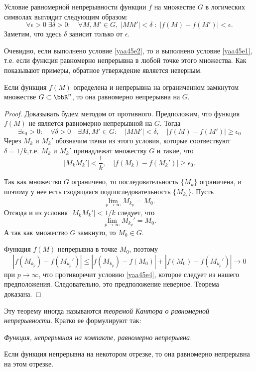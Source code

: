 Условие равномерной непрерывности функции $f$ на множестве $G$ в логических символах выглядит следующим образом:
\begin{equation}\label{yaa45e2}
\forall\epsilon>0\;\exists\delta>0:\quad\forall M, M'\in G,\; |MM'|<\delta\; :\; |f(M)-f(M')|<\epsilon.
\end{equation}
Заметим, что здесь $\delta$ зависит только от $\epsilon$.

Очевидно, если выполнено условие \eqref{yaa45e2}, то и выполнено условие \eqref{yaa45e1}, т.е. если функция равномерно непрерывна в любой точке этого множества. Как показывают примеры, обратное утверждение является неверным.

\begin{thm}
Если функция $f(M)$ определена и непрерывна на ограниченном замкнутом множестве $G\subset\bbR^n$, то она равномерно непрерывна на $G$.
\end{thm}

\begin{proof}
Доказывать будем методом от противного. Предположим, что функция $f(M)$ не является равномерно непрерывной на $G$. Тогда
$$
\exists\epsilon_0>0:\quad\forall\delta>0\quad\exists M,M'\in G:\quad |MM'|<\delta, \quad |f(M)-f(M')|\ge \epsilon_0
$$
Через $M_k$ и $M_k'$ обозначим точки из этого условия, которые соотвествуют $\delta=1/k$,т.е. $M_k$ и $M_k'$ принадлежат множеству $G$ и такие, что 
\begin{equation}\label{yaa45e4}
|M_kM_k'|<\frac{1}{k},\quad|f(M_k)-f(M_k')|\ge \epsilon_0.
\end{equation}

Так как множество $G$ ограничено, то последовательность $\{M_k\}$ ограничена, и поэтому у нее есть сходящаяся подпоследовательность $\{M_{k_p}\}$. Пусть
$$
\lim\limits_{p\to\infty} M_{k_p} =M_0.
$$
Отсюда и из условия $|M_kM_k'|<1/k$ следует, что 
$$
\lim\limits_{p\to\infty} M_{k_p}' =M_0.
$$
А так как множество $G$ замкнуто, то $M_0 \in G$.

Функция $f(M)$ непрерывна в точке $M_0$, поэтому
$$
|f(M_{k_p})-f(M_{k_p}')|\le |f(M_{k_p})-f(M_0)|+|f(M_0)-f(M_{k_p}')|\to 0
$$
при $p\to\infty$, что противоречит условию \eqref{yaa45e4}, которое следует из нашего предположения. Следовательно, это предположение неверное. Теорема доказана.
\end{proof}

Эту теорему иногда называются \textit{теоремой Кантора о равномерной непрерывности}. Кратко ее формулируют так:

\textit{Функция, непрерывная на компакте, равномерно непрерывна.}
\begin{cons}
Если функция непрерывна на некотором отрезке, то она равномерно непрерывна на этом отрезке. 
\end{cons}

















